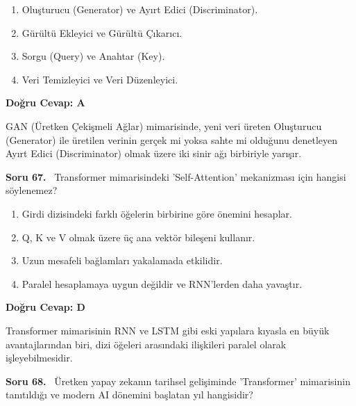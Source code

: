 \documentclass[11pt,a4paper,openany]{book}
\begin{document}
\begin{enumerate}[label=\Alph*), leftmargin=25pt, topsep=4pt, itemsep=2pt]
        \item Oluşturucu (Generator) ve Ayırt Edici (Discriminator).
        \item Gürültü Ekleyici ve Gürültü Çıkarıcı.
        \item Sorgu (Query) ve Anahtar (Key).
        \item Veri Temizleyici ve Veri Düzenleyici.
\end{enumerate}

\vspace{4pt}
\begin{tcolorbox}[title=Cevap ve Açıklama, colback=gray!3!white, colframe=primarycolor!90!black, arc=2mm, fonttitle=\bfseries\sffamily, top=6pt, bottom=6pt]
    \textbf{Doğru Cevap: A}

    \vspace{2pt}
    GAN (Üretken Çekişmeli Ağlar) mimarisinde, yeni veri üreten Oluşturucu (Generator) ile üretilen verinin gerçek mi yoksa sahte mi olduğunu denetleyen Ayırt Edici (Discriminator) olmak üzere iki sinir ağı birbiriyle yarışır.
\end{tcolorbox}
\vspace{10pt}
\needspace{5cm}
\vspace{8pt}
\noindent\textbf{\large\sffamily Soru 67.} \ Transformer mimarisindeki 'Self-Attention' mekanizması için hangisi söylenemez?

\begin{enumerate}[label=\Alph*), leftmargin=25pt, topsep=4pt, itemsep=2pt]
        \item Girdi dizisindeki farklı öğelerin birbirine göre önemini hesaplar.
        \item Q, K ve V olmak üzere üç ana vektör bileşeni kullanır.
        \item Uzun mesafeli bağlamları yakalamada etkilidir.
        \item Paralel hesaplamaya uygun değildir ve RNN'lerden daha yavaştır.
\end{enumerate}

\vspace{4pt}
\begin{tcolorbox}[title=Cevap ve Açıklama, colback=gray!3!white, colframe=primarycolor!90!black, arc=2mm, fonttitle=\bfseries\sffamily, top=6pt, bottom=6pt]
    \textbf{Doğru Cevap: D}

    \vspace{2pt}
    Transformer mimarisinin RNN ve LSTM gibi eski yapılara kıyasla en büyük avantajlarından biri, dizi öğeleri arasındaki ilişkileri paralel olarak işleyebilmesidir.
\end{tcolorbox}
\vspace{10pt}
\needspace{5cm}
\vspace{8pt}
\noindent\textbf{\large\sffamily Soru 68.} \ Üretken yapay zekanın tarihsel gelişiminde 'Transformer' mimarisinin tanıtıldığı ve modern AI dönemini başlatan yıl hangisidir?
\end{document}
